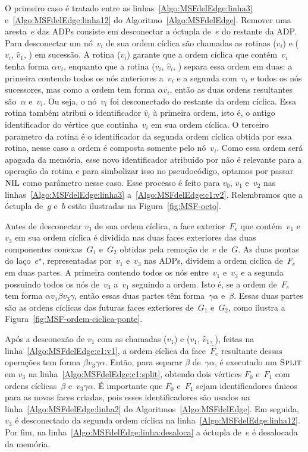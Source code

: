 O primeiro caso é tratado entre as linhas~\ref{Algo:MSFdelEdge:linha3} e~\ref{Algo:MSFdelEdge:linha12} do Algoritmo~\ref{Algo:MSFdelEdge}.
Remover uma aresta~$e$ das ADPs consiste em desconectar a óctupla de~$e$ do restante da ADP. 
Para desconectar um nó~$v_i$ de sua ordem cíclica são chamadas as rotinas \LCOCycle($v_i$) e \LCOSplit($v_i$, $\hat v_1$, \Nil) em sucessão.
A rotina \LCOCycle($v_i$) garante que a ordem cíclica que contém~$v_i$ tenha forma $\alpha v_i$, enquanto que a rotina \LCOSplit($v_i$, $\hat v_i$, \Nil) separa essa ordem em duas: a primeira contendo todos os nós anteriores a~$v_i$ e a segunda com~$v_i$ e todos os nós sucessores, mas como a ordem tem forma $\alpha v_i$, então as duas ordens resultantes são~$\alpha$ e~$v_i$.
Ou seja, o nó~$v_i$ foi desconectado do restante da ordem cíclica.
Essa rotina também atribui o identificador $\hat v_i$ à primeira ordem, isto é, o antigo identificador do vértice que continha~$v_i$ em sua ordem cíclica.
O terceiro parametro da rotina \LCOSplit{} é o identificador da segunda ordem cíclica obtida por essa rotina, nesse caso a ordem é composta somente pelo nó~$v_i$.
Como essa ordem será apagada da memória, esse novo identificador atribuído por \LCOSplit{} não é relevante para a operação da rotina \MSFdelEdge{} e para simbolizar isso no pseudocódigo, optamos por passar $\text{NIL}$ como parâmetro nesse caso.
Esse processo é feito para $v_0$, $v_1$ e~$v_2$ nas linhas~\ref{Algo:MSFdelEdge:linha3} a~\ref{Algo:MSFdelEdge:c1:v2}.
Relembramos que a óctupla de~$g$ e~$b$ estão ilustradas na Figura~\ref{fig:MSF-octo}.

Antes de desconectar $v_3$ de sua ordem cíclica, a face exterior~$F_e$ que contém~$v_1$ e~$v_3$ em sua ordem cíclica é dividida nas duas faces exteriores das duas componentes conexas~$G_1$ e~$G_2$ obtidas pela remoção de~$e$ de~$G$.
As duas pontas do laço~$e^\star$, representadas por~$v_1$ e~$v_3$ nas ADPs, dividem a ordem cíclica de~$F_e$ em duas partes.
A primeira contendo todos os nós entre~$v_1$ e~$v_3$ e a segunda possuindo todos os nós de~$v_3$ a~$v_1$ seguindo a ordem. 
Isto é, se a ordem de~$F_e$ tem forma $\alpha v_1\beta v_3\gamma$, então essas duas partes têm forma~$\gamma\alpha$ e~$\beta$.
Essas duas partes são as ordens cíclicas das futuras faces exteriores de~$G_1$ e~$G_2$, como ilustra a Figura~\ref{fig:MSF-ordem-ciclica-ponte}.

Após a desconexão de $v_1$ com as chamadas \LCOCycle($v_1$) e \LCOSplit($v_1$, $\hat v_1$, \Nil), feitas na linha~\ref{Algo:MSFdelEdge:c1:v1}, a ordem cíclica da face~$\hat F_e$ resultante dessas operações tem forma $\beta v_3\gamma\alpha$.
Então, para separar $\beta$ de~$\gamma\alpha$, é executado um $\text{\scshape Split}$ em $v_3$ na linha~\ref{Algo:MSFdelEdge:c1:split}, obtendo dois vértices $F_0$ e~$F_1$ com ordens cíclicas~$\beta$ e~$v_3\gamma\alpha$.
É importante que $F_0$ e~$F_1$ sejam identificadores únicos para as novas faces criadas, pois esses identificadores são usados na linha~\ref{Algo:MSFdelEdge:linha2} do Algoritmos~\ref{Algo:MSFdelEdge}.
Em seguida, $v_3$ é desconectado da segunda ordem cíclica na linha~\ref{Algo:MSFdelEdge:linha12}.
Por fim, na linha~\ref{Algo:MSFdelEdge:linha:desaloca} a óctupla de~$e$ é desalocada da memória.

